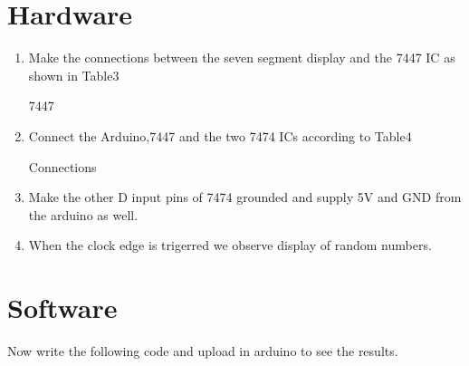 \documentclass[10pt,a4paper]{article}
\begin{document}
\section{Hardware}
\begin{enumerate}
\item Make the connections between the seven segment display and the 7447 IC as shown in Table3
\begin{table}[!h]                                
\centering
   
\caption{7447}                               
\label{table:7447}                       
\end{table}
\item Connect the Arduino,7447 and the two 7474 ICs according to Table4
\begin{table}[!h]                                 
\centering	
 
\caption{Connections}                                   
\label{table:connections}                       
\end{table}
\item Make the other D input pins of 7474 grounded and supply  5V and GND from the arduino as well.
\item When the clock edge is trigerred we observe display of random numbers.
\end{enumerate}
\section{Software}
Now write the following code and upload in arduino to see the results.

\end{document}
